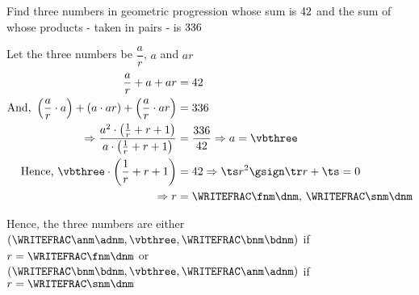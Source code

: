 



\DIVIDE\vbtwo\vbone\vbthree
\SQUARE\vbone\tp
\SUBTRACT\vbtwo\tp\tq
\FRACTIONSIMPLIFY\tq\vbtwo\tr\ts
\QUADEQNROOTS\ts\tr\ts\dnm\fnm\snm
{}\fnm\dnm\anm\adnm
{}\fnm\dnm\bnm\bdnm

\question[3] Find three numbers in geometric progression whose sum is $42$ and the
sum of whose products - taken in pairs - is $336$

\watchout

\ifprintanswers
\fi 

\begin{solution}[\halfpage]
	Let the three numbers be $\dfrac{a}{r}$, $a$ and $ar$
	\begin{align}
		\dfrac{a}{r} + a + ar &= \vbone \\
		\text{And, } \left( \dfrac{a}{r}\cdot a\right) + \left( a\cdot ar\right) + 
		\left( \dfrac{a}{r}\cdot ar\right) &= \vbtwo \\
		\Rightarrow \dfrac{a^2\cdot\left( \frac{1}{r} + r + 1 \right)}{a\cdot\left( \frac{1}{r} + r + 1\right)}
		&= \dfrac{\vbtwo}{\vbone} \Rightarrow a = \vbthree \\
		\text{Hence, } \vbthree\cdot\left( \dfrac{1}{r} + r + 1 \right) &= \vbone 
    \Rightarrow \ts r^2\gsign\tr r + \ts = 0 \\
    \Rightarrow r &= \WRITEFRAC\fnm\dnm,\,\WRITEFRAC\snm\dnm
	\end{align}
	
	Hence, the three numbers are either 
    $\left( \WRITEFRAC\anm\adnm, \vbthree, \WRITEFRAC\bnm\bdnm \right)$ if $r=\WRITEFRAC\fnm\dnm$ or 
    $\left( \WRITEFRAC\bnm\bdnm, \vbthree, \WRITEFRAC\anm\adnm \right)$ if $r=\WRITEFRAC\snm\dnm$
\end{solution}

